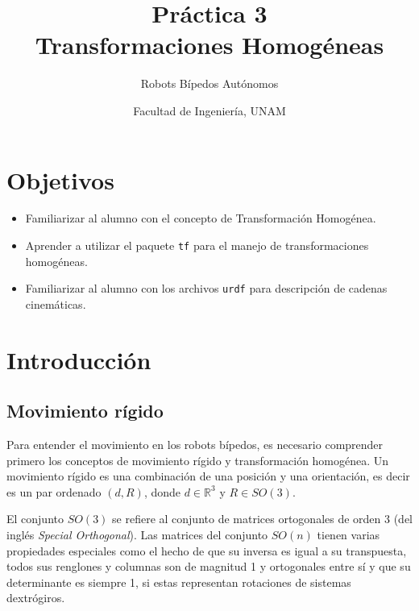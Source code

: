 \documentclass[letterpaper,12pt]{article}
\title{Práctica 3 \\ Transformaciones Homogéneas}
\author{Robots Bípedos Autónomos}
\date{Facultad de Ingeniería, UNAM}
\begin{document}
\renewcommand{\tablename}{Tabla}
\maketitle
\section*{Objetivos}
\begin{itemize}
\item Familiarizar al alumno con el concepto de Transformación Homogénea.
\item Aprender a utilizar el paquete \texttt{tf} para el manejo de transformaciones homogéneas.
\item Familiarizar al alumno con los archivos \texttt{urdf} para descripción de cadenas cinemáticas.
\end{itemize}

\section{Introducción}
\subsection{Movimiento rígido}
Para entender el movimiento en los robots bípedos, es necesario comprender primero los conceptos de movimiento rígido y transformación homogénea. Un movimiento rígido es una combinación de una posición y una orientación, es decir es un par ordenado $(d,R)$, donde $d\in \mathbb{R}^3$ y $R\in SO(3)$.

El conjunto $SO(3)$ se refiere al conjunto de matrices ortogonales de orden 3 (del inglés \textit{Special Orthogonal}). Las matrices del conjunto $SO(n)$ tienen varias propiedades especiales como el hecho de que su inversa es igual a su transpuesta, todos sus renglones y columnas son de magnitud 1 y ortogonales entre sí y que su determinante es siempre 1, si estas representan rotaciones de sistemas dextrógiros.
\end{document}
